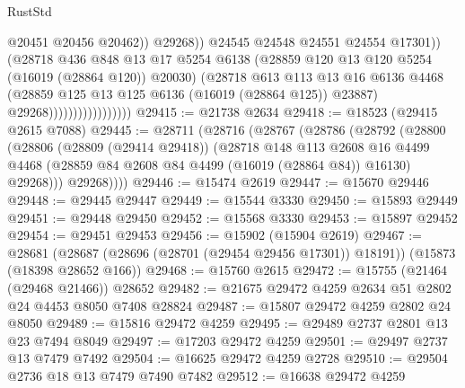 \begin{lexlean}{RustStd}
\begin{coremodule}
                                              @20451
                                              @20456
                                              @20462))
                                          @29268))
                                      @24545
                                      @24548
                                      @24551
                                      @24554
                                      @17301))
                                  (@28718
                                    @436
                                    @848
                                    @13
                                    @17
                                    @5254
                                    @6138
                                    (@28859 @120 @13 @120 @5254 (@16019 (@28864 @120)) @20030)
                                    (@28718
                                      @613
                                      @113
                                      @13
                                      @16
                                      @6136
                                      @4468
                                      (@28859 @125 @13 @125 @6136 (@16019 (@28864 @125)) @23887)
                                      @29268)))))))))))))))))
@29415 := @21738 @2634
@29418 := @18523 (@29415 @2615 @7088)
@29445 := @28711
    (@28716
      (@28767
        (@28786
          (@28792
            (@28800
              (@28806
                (@28809 (@29414 @29418))
                (@28718
                  @148
                  @113
                  @2608
                  @16
                  @4499
                  @4468
                  (@28859 @84 @2608 @84 @4499 (@16019 (@28864 @84)) @16130)
                  @29268)))
            @29268))))
@29446 := @15474 @2619
@29447 := @15670 @29446
@29448 := @29445 @29447
@29449 := @15544 @3330
@29450 := @15893 @29449
@29451 := @29448 @29450
@29452 := @15568 @3330
@29453 := @15897 @29452
@29454 := @29451 @29453
@29456 := @15902 (@15904 @2619)
@29467 := @28681
    (@28687 (@28696 (@28701 (@29454 @29456 @17301)) @18191))
    (@15873 (@18398 @28652 @166))
@29468 := @15760 @2615
@29472 := @15755 (@21464 (@29468 @21466)) @28652
@29482 := @21675 @29472 @4259 @2634 @51 @2802 @24 @4453 @8050 @7408 @28824
@29487 := @15807 @29472 @4259 @2802 @24 @8050
@29489 := @15816 @29472 @4259
@29495 := @29489 @2737 @2801 @13 @23 @7494 @8049
@29497 := @17203 @29472 @4259
@29501 := @29497 @2737 @13 @7479 @7492
@29504 := @16625 @29472 @4259 @2728
@29510 := @29504 @2736 @18 @13 @7479 @7490 @7482
@29512 := @16638 @29472 @4259

\end{coremodule}
\end{lexlean}

